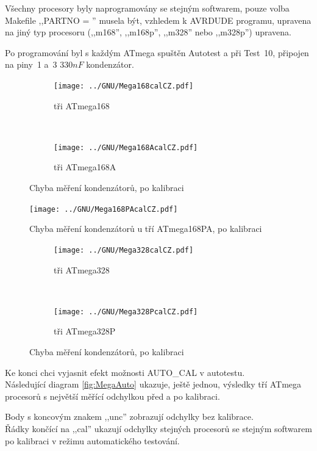 Všechny procesory byly naprogramovány se stejným softwarem, pouze volba Makefile ,,PARTNO = '' musela být, vzhledem k AVRDUDE programu, upravena na jiný typ procesoru (,,m168'', ,,m168p'', ,,m328'' nebo ,,m328p'') upravena.

Po programování byl s každým ATmega spuštěn Autotest a při Test~10, připojen na piny~1 a~3 \(330nF\) kondenzátor.

\begin{figure}[H]
  \begin{subfigure}[b]{9cm}
    \centering
    \texttt{[image: ../GNU/Mega168calCZ.pdf]}
    \caption{tři ATmega168}
    \label{fig:mega168cal}
  \end{subfigure}
  ~
  \begin{subfigure}[b]{9cm}
    \centering
    \texttt{[image: ../GNU/Mega168AcalCZ.pdf]}
    \caption{tři ATmega168A}
    \label{fig:mega168Acal}
  \end{subfigure}
  \caption{Chyba měření kondenzátorů, po kalibraci}
\end{figure}

\begin{figure}[H]
\centering
\texttt{[image: ../GNU/Mega168PAcalCZ.pdf]}
\caption{Chyba měření kondenzátorů u tří ATmega168PA, po kalibraci}
\label{fig:mega168PAcal}
\end{figure}

\begin{figure}[H]
  \begin{subfigure}[b]{9cm}
    \centering
    \texttt{[image: ../GNU/Mega328calCZ.pdf]}
    \caption{tři ATmega328}
    \label{fig:mega328cal}
  \end{subfigure}
  ~
  \begin{subfigure}[b]{9cm}
    \centering
    \texttt{[image: ../GNU/Mega328PcalCZ.pdf]}
    \caption{tři ATmega328P}
    \label{fig:mega328Pcal}
  \end{subfigure}
  \caption{Chyba měření kondenzátorů, po kalibraci}
\end{figure}

Ke konci chci vyjasnit efekt možnosti AUTO\_CAL v autotestu.\\
Následující diagram \ref{fig:MegaAuto} ukazuje, ještě jednou, výsledky tří ATmega procesorů
s největší měřící odchylkou před a po kalibraci.

Body s koncovým znakem ,,unc'' zobrazují odchylky bez kalibrace.\\
Řádky končící na ,,cal'' ukazují odchylky stejných procesorů
se stejným softwarem po kalibraci v režimu automatického testování.

